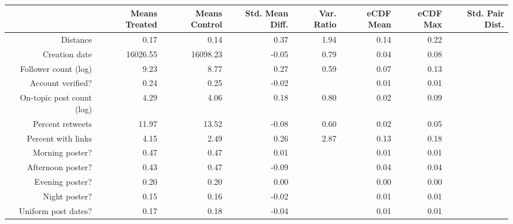 \begin{table}[ht]
\centering
\begin{tabular}{rrrrrrrr}
  & Means Treated & Means Control & Std. Mean Diff. & Var. Ratio & eCDF Mean & eCDF Max & Std. Pair Dist. \\ 
  \hline
Distance & 0.17 & 0.14 & 0.37 & 1.94 & 0.14 & 0.22 &  \\ 
   \hline
Creation date & 16026.55 & 16098.23 & -0.05 & 0.79 & 0.04 & 0.08 &  \\ 
   \hline
Follower count (log) & 9.23 & 8.77 & 0.27 & 0.59 & 0.07 & 0.13 &  \\ 
   \hline
Account verified? & 0.24 & 0.25 & -0.02 &  & 0.01 & 0.01 &  \\ 
   \hline
On-topic post count (log) & 4.29 & 4.06 & 0.18 & 0.80 & 0.02 & 0.09 &  \\ 
   \hline
Percent retweets & 11.97 & 13.52 & -0.08 & 0.60 & 0.02 & 0.05 &  \\ 
   \hline
Percent with links & 4.15 & 2.49 & 0.26 & 2.87 & 0.13 & 0.18 &  \\ 
   \hline
Morning poster? & 0.47 & 0.47 & 0.01 &  & 0.01 & 0.01 &  \\ 
   \hline
Afternoon poster? & 0.43 & 0.47 & -0.09 &  & 0.04 & 0.04 &  \\ 
   \hline
Evening poster? & 0.20 & 0.20 & 0.00 &  & 0.00 & 0.00 &  \\ 
   \hline
Night poster? & 0.15 & 0.16 & -0.02 &  & 0.01 & 0.01 &  \\ 
   \hline
Uniform post dates? & 0.17 & 0.18 & -0.04 &  & 0.01 & 0.01 &  \\ 
   \hline
\end{tabular}
\end{table}
